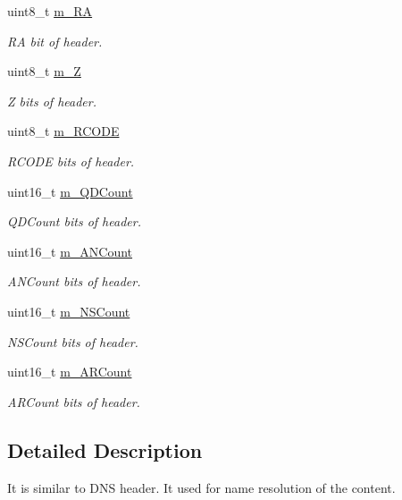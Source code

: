 \begin{DoxyCompactItemize}
uint8\-\_\-t \hyperlink{classns3_1_1DnsPlusHeader_a275459d7076136ce2c7099734b264cd5}{m\-\_\-\-R\-A}
\begin{DoxyCompactList}\small\item\em R\-A bit of header. \end{DoxyCompactList}\item 
uint8\-\_\-t \hyperlink{classns3_1_1DnsPlusHeader_a9fb25d01e3e4ce98158926c2195a20cf}{m\-\_\-\-Z}
\begin{DoxyCompactList}\small\item\em Z bits of header. \end{DoxyCompactList}\item 
uint8\-\_\-t \hyperlink{classns3_1_1DnsPlusHeader_a35835f0ee81cfec4806f85d9b62daca6}{m\-\_\-\-R\-C\-O\-D\-E}
\begin{DoxyCompactList}\small\item\em R\-C\-O\-D\-E bits of header. \end{DoxyCompactList}\item 
uint16\-\_\-t \hyperlink{classns3_1_1DnsPlusHeader_ab85daf2b1bc16d2c58d1b6c1e21395d8}{m\-\_\-\-Q\-D\-Count}
\begin{DoxyCompactList}\small\item\em Q\-D\-Count bits of header. \end{DoxyCompactList}\item 
uint16\-\_\-t \hyperlink{classns3_1_1DnsPlusHeader_ac01fe04b25d9e3e75a4ae181cc8a156f}{m\-\_\-\-A\-N\-Count}
\begin{DoxyCompactList}\small\item\em A\-N\-Count bits of header. \end{DoxyCompactList}\item 
uint16\-\_\-t \hyperlink{classns3_1_1DnsPlusHeader_ace416d666df5fe25acfbfdd7aad309ce}{m\-\_\-\-N\-S\-Count}
\begin{DoxyCompactList}\small\item\em N\-S\-Count bits of header. \end{DoxyCompactList}\item 
uint16\-\_\-t \hyperlink{classns3_1_1DnsPlusHeader_afe7adb4352d8f52c21a7c3f922314045}{m\-\_\-\-A\-R\-Count}
\begin{DoxyCompactList}\small\item\em A\-R\-Count bits of header. \end{DoxyCompactList}\end{DoxyCompactItemize}


\subsection{Detailed Description}
It is similar to D\-N\-S header. It used for name resolution of the content. 

